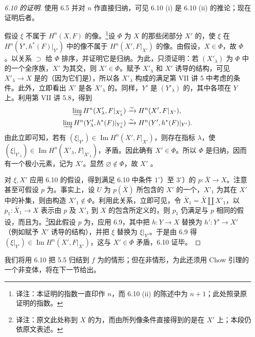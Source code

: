 \begin{proof}[6.10 的证明]
使用 6.5 并对 $n$ 作直接归纳，可见 6.10 (i) 是 6.10 (ii) 的推论；现在证明后者。

假设 $\xi$ 不属于 $H^n(X,F)$ 的像。\footnote{译注：本证明的指数一直印作 $n$，而 6.10 (ii) 的陈述中为 $n+1$；此处照录原证明的指数。}设 $\Phi$ 为 $X$ 的那些闭部分 $X'$ 的，使 $\xi$ 在 $H^n(Y',h^*(F)|_{Y'})$ 中的像不属于 $H^n(X',F|_{X'})$ 的像。由假设，$X\in\Phi$，故 $\Phi$ 。以关系 $\supset$ 给 $\Phi$ 排序，并证明它是归纳。为此，只须证明：若 $(X'_\lambda)$ 为 $\Phi$ 中的一个全序族，$X'$ 为其交，则 $X'\in\Phi$。赋予 $X'_\lambda$ 和 $X'$ 诱导的结构，可见 $X'_\lambda\to X$ 是的（因为它们是），所以各 $X'_\lambda$ 构成的满足第 VII 讲 5 中考虑的条件。此外，立即看出 $X'$ 是各 $X'_\lambda$ 的。同样，$Y'$ 是 $(Y'_\lambda)$ 的，其中各项在 $Y$ 上。利用第 VII 讲 5.8，得到
\[
\begin{aligned}
\varinjlim H^n(X'_\lambda,F|_{X'_\lambda})&\xrightarrow{\sim}H^n(X',F|_{X'}),\\
\varinjlim H^n(Y'_\lambda,h^*(F)|_{Y'_\lambda})&\xrightarrow{\sim}H^n(Y',h^*(F)|_{Y'}).
\end{aligned}
\]
由此立即可知，若有 $(\xi|_{Y'})\in\operatorname{Im}H^n(X',F|_{X'})$，则存在指标 $\lambda$，使 $(\xi|_{Y'_\lambda})\in\operatorname{Im}H^n(X'_\lambda,F|_{X'_\lambda})$，矛盾。因此确有 $X'\in\Phi$。所以 $\Phi$ 是归纳，因而有一个极小元素，记为 $X'$。显然 $\varnothing\notin\Phi$，故 $X'$ 。

对 $\xi,X'$ 应用 6.10 的假设，得到满足 6.10 中条件 $1^\circ$）至 $3^\circ$）的 $p:\bar X\to X$。注意甚至可假设 $p$ 为。事实上，设 $U$ 为 $p(\bar X)$ 所包含的 $X'$ 的一个，$X'_1$ 为其在 $X'$ 中的补集，则由构造 $X'_1\notin\Phi$。利用此关系，立即可见，令 $\bar X_1=\bar X\amalg X'_1$，以 $p_1:\bar X_1\to X$ 表示由 $p$ 及 $X'_1$ 到 $X$ 的包含所定义的，则 $p_1$ 仍满足与 $p$ 相同的假设，而且为。\footnote{译注：原文此处称到 $X$ 的为，而由所列像条件直接得到的是在 $X'$ 上；本段仍依原文表述。}因此假设 $p$ 为，应用 6.9，其中把 $h:Y\to X$ 替换为 $h':Y'\to X'$（例如赋予 $X'$ 诱导的结构），并把 $\xi$ 替换为 $\xi|_{Y'}$。于是由 6.9 得 $(\xi|_{Y'})\in\operatorname{Im}H^n(X',F|_{X'})$，这与 $X'\in\Phi$ 矛盾，6.10 证毕。
\end{proof}
我们将用 6.10 把 5.5 归结到 $f$ 为的情形；但在非情形，为此还须用 Chow 引理的一个非变体，将在下一节给出。

